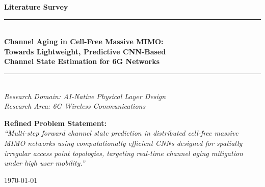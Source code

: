 \documentclass[12pt,a4paper]{article}
\begin{document}
\begin{titlepage}
  \centering
  \vspace*{2cm}
  {\LARGE\bfseries Literature Survey}\\[0.6em]
  \rule{\linewidth}{0.8pt}\\[0.8em]
  {\Large\bfseries Channel Aging in Cell-Free Massive MIMO:\\[0.5em]
   Towards Lightweight, Predictive CNN-Based\\[0.5em]
   Channel State Estimation for 6G Networks}\\[0.8em]
  \rule{\linewidth}{0.8pt}\\[2.0cm]

  {\normalsize\itshape
  Research Domain: AI-Native Physical Layer Design\\[0.3em]
  Research Area: 6G Wireless Communications}\\[2.5cm]

  \begin{minipage}{0.85\linewidth}
    \centering
    {\small\textbf{Refined Problem Statement:}}\\[0.5em]
    {\small\itshape
    ``Multi-step forward channel state prediction in distributed
    cell-free massive MIMO networks using computationally efficient
    CNNs designed for spatially irregular access point topologies,
    targeting real-time channel aging mitigation under high user
    mobility.''}
  \end{minipage}

  \vfill
  {\small\today}
\end{titlepage}

\begin{abstract}
\noindent
This literature survey examines the problem of channel aging in
cell-free massive multiple-input multiple-output (MIMO) systems and
surveys existing approaches for mitigating it through channel prediction.
Beginning with foundational work on massive MIMO channel estimation,
the survey traces the evolution from classical model-based predictors
--- including autoregressive (AR) models and Kalman filters --- through
early machine learning approaches, to state-of-the-art deep learning
architectures employing convolutional neural networks (CNNs), long
short-term memory (LSTM) networks, and Transformer models. Special
attention is given to the cell-free architecture and the unique
challenges it introduces: irregular access point (AP) topology,
distributed processing constraints, and the need for computationally
efficient edge-deployable models. The survey synthesises findings from
over twenty peer-reviewed publications and identifies the critical
research gap that the proposed project seeks to address: the absence
of lightweight, multi-step predictive CNN architectures specifically
designed for the spatially irregular, distributed topology of cell-free
massive MIMO systems under high user mobility.
\end{abstract}
\end{document}

